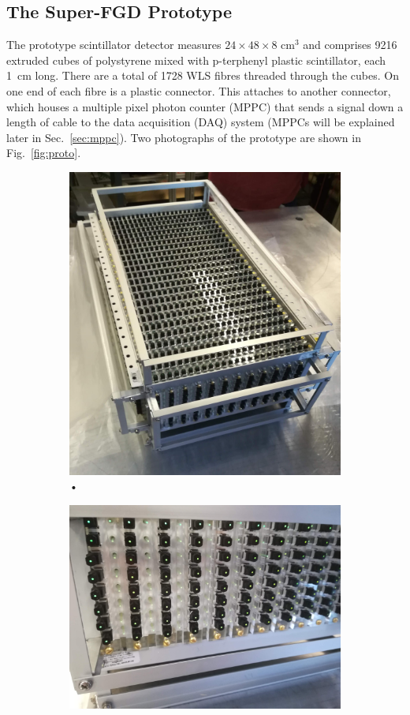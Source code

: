 \documentclass[aps,pra,12pt,notitlepage,tightenlines]{revtex4-1}
\begin{document}
\subsection{The Super-FGD Prototype}
The prototype scintillator detector measures $24\times48\times8$ cm$^3$ and comprises 9216 extruded cubes of polystyrene mixed with p-terphenyl plastic scintillator, each 1~cm long. There are a total of 1728 WLS fibres threaded through the cubes. On one end of each fibre is a  plastic connector. This attaches to another connector, which houses a multiple pixel photon counter (MPPC) that sends a signal down a length of cable to the data acquisition (DAQ) system (MPPCs will be explained later in Sec.\ \ref{sec:mppc}). Two photographs of the prototype are shown in Fig.\ \ref{fig:proto}.
 \begin{figure}
  \centering
  \begin{subfigure}{.5\textwidth}
   \centering
   \includegraphics[width=.7\linewidth]{proto}
   \caption{•}
   \label{fig:protoa}
  \end{subfigure}%
  \begin{subfigure}{.5\textwidth}
   \centering
   \includegraphics[width=.8\linewidth]{side}

\end{subfigure}
\end{figure}
\end{document}
